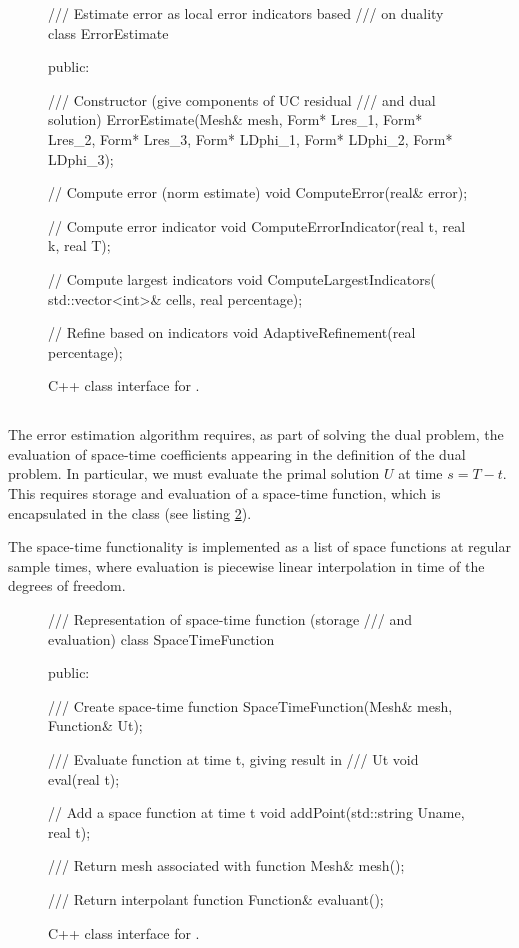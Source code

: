 \begin{figure}
\begin{c++}
/// Estimate error as local error indicators based
/// on duality
class ErrorEstimate
{
public:

  /// Constructor (give components of UC residual
  /// and dual solution)
  ErrorEstimate(Mesh& mesh,
		Form* Lres_1,
		Form* Lres_2,
		Form* Lres_3,
		Form* LDphi_1,
		Form* LDphi_2,
		Form* LDphi_3);

  // Compute error (norm estimate)
  void ComputeError(real& error);

  // Compute error indicator
  void ComputeErrorIndicator(real t, real k,
                             real T);

  // Compute largest indicators
  void ComputeLargestIndicators(
    std::vector<int>& cells,
    real percentage);

  // Refine based on indicators
  void AdaptiveRefinement(real percentage);
}
\end{c++}
\caption{C++ class interface for .}
\label{code:ErrorEstimate}
\end{figure}

\subsection{}

The error estimation algorithm requires, as part of solving the dual
problem, the evaluation of space-time coefficients appearing in the
definition of the dual problem. In particular, we must evaluate the
primal solution $U$ at time $s = T - t$.  This requires storage and
evaluation of a space-time function, which is encapsulated in the
 class (see listing
\ref{code:SpaceTimeFunction}).

The space-time functionality is implemented as a list of space
functions at regular sample times, where evaluation is piecewise
linear interpolation in time of the degrees of freedom.

\begin{figure}
\begin{c++}
/// Representation of space-time function (storage
/// and evaluation)
class SpaceTimeFunction
{
public:

  /// Create space-time function
  SpaceTimeFunction(Mesh& mesh, Function& Ut);

  /// Evaluate function at time t, giving result in
  /// Ut
  void eval(real t);

  // Add a space function at time t
  void addPoint(std::string Uname, real t);

  /// Return mesh associated with function
  Mesh& mesh();

  /// Return interpolant function
  Function& evaluant();
}
\end{c++}
\caption{C++ class interface for .}
\label{code:SpaceTimeFunction}
\end{figure}

